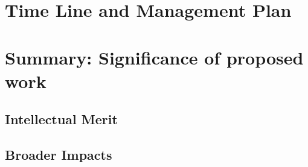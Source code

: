 \documentclass{proposal}
\begin{document}
\section{Time Line and Management Plan}

\section{Summary:  Significance of proposed work}

\subsection{Intellectual Merit}

\subsection{Broader Impacts}



\newpage
{}
\renewcommand{\thepage} {E--\arabic{page}}




\newpage
{}
\renewcommand{\thepage} {G--\arabic{page}}
\end{document}
